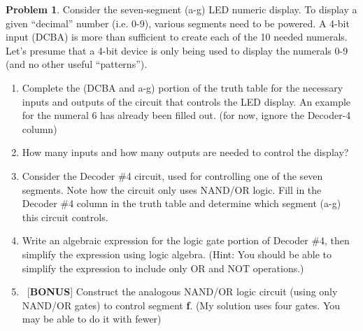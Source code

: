 \documentclass[10pt]{article}
\theoremstyle{definition}
\newtheorem{problem}{Problem}
\begin{document}
\begin{problem}
Consider the seven-segment (a-g) LED numeric display. To display a given ``decimal'' number (i.e. 0-9), various segments need to be powered. 
A 4-bit input (DCBA) is more than sufficient to create each of the 10 needed numerals. Let's presume that a 4-bit device is only being used to display 
the numerals 0-9 (and no other useful ``patterns'').
\begin{enumerate}[label=(\alph*)]
  \item Complete the (DCBA and a-g) portion of the truth table for the necessary inputs and outputs of the circuit that controls the LED display.
        An example for the numeral 6 has already been filled out. (for now, ignore the Decoder-4 column)
  \item How many inputs and how many outputs are needed to control the display?
  \item Consider the Decoder \#4 circuit, used for controlling one of the seven segments. Note how the circuit only uses NAND/OR logic.
        Fill in the Decoder \#4 column in the truth table and determine which segment (a-g) this circuit controls.
  \item Write an algebraic expression for the logic gate portion of Decoder \#4, then simplify the expression using logic algebra.
        (Hint: You should be able to simplify the expression to include only OR and NOT operations.)
  \item ~[\textbf{BONUS}] Construct the analogous NAND/OR logic circuit (using only NAND/OR gates) to control segment \textbf{f}. (My solution uses four gates. You may be able to do it with fewer)
\end{enumerate}
\end{problem}
\end{document}
